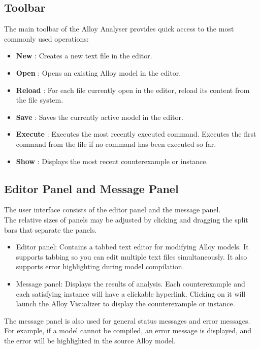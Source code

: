 \documentclass[a4paper,12pt]{extarticle}
\begin{document}
\subsection{Toolbar}
\label{Tools}
The main toolbar of the Alloy Analyser provides quick access to the most commonly used operations:
\begin{itemize}
\item \textbf{New} : Creates a new text file in the editor.
\item \textbf{Open} : Opens an existing Alloy model in the editor.
\item \textbf{Reload} : For each file currently open in the editor, reload its content from the file system.
\item \textbf{Save} : Saves the currently active model in the editor.
\item \textbf{Execute} : Executes the most recently executed command. Executes the first command from the file if no command has been executed so far.
\item \textbf{Show} : Displays the most recent counterexample or instance.
\end{itemize}
\subsection{Editor Panel and Message Panel}
\label{Editor and Message Panel}
The user interface consists of the editor panel and the message panel.\\
The relative sizes of panels may be adjusted by clicking and dragging the split bars that separate the panels.
\begin{itemize}
\item   Editor panel: Contains a tabbed text editor for modifying Alloy models. It supports tabbing so you can edit multiple text files simultaneously. It also supports error highlighting during model compilation.
\item   Message panel: Displays the results of analysis. Each counterexample and each satisfying instance will have a clickable hyperlink. Clicking on it will launch the Alloy Visualizer to display the counterexample or instance.
\end{itemize}
The message panel is also used for general status messages and error messages.\\
For example, if a model cannot be compiled, an error message is displayed, and the error will be highlighted in the source Alloy model.
\end{document}
